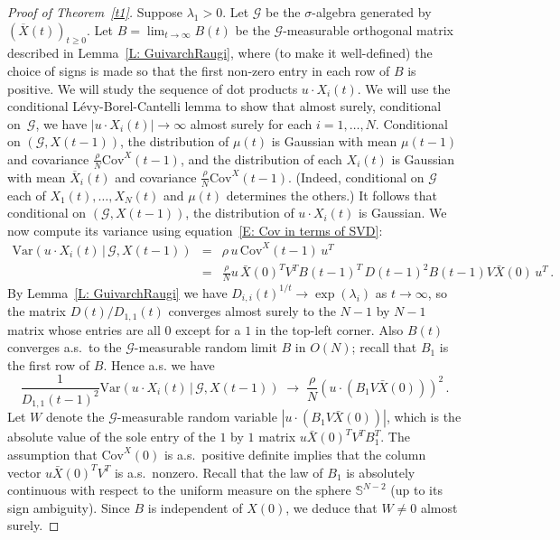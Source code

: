 \documentclass[12pt]{article}
\newcommand{\Cov}{\mathrm{Cov}}
\newcommand{\1}{\mathbf{1}}
\begin{document}
\begin{proof}[Proof of Theorem~\ref{t1}]
Suppose $\lambda_1 > 0$. Let $\mathcal{G}$ be the $\sigma$-algebra generated by $(\overline{X}(t))_{t \ge 0}$. 
Let $B = \lim_{t \to \infty} B(t)$ be the $\mathcal{G}$-measurable orthogonal matrix described in Lemma~\ref{L: GuivarchRaugi}, where (to make it well-defined) the choice of signs is made so that the first non-zero entry in each row of $B$ is positive. We will study the sequence of dot products $u \cdot X_i(t)$.
We will use the conditional L\'evy-Borel-Cantelli lemma to show that almost surely, conditional on~$\mathcal{G}$, we have $|u \cdot X_i(t)| \to \infty$ almost surely for each $i=1, \dots, N$. Conditional on $(\mathcal{G}, X(t-1))$, the distribution of $\mu(t)$ is Gaussian with mean $\mu(t-1)$ and covariance $\frac{\rho}{N} \Cov^X(t-1)$, and the distribution of each $X_i(t)$ is Gaussian with mean $\overline{X}_i(t)$ and covariance $\frac{\rho}{N} \Cov^X(t-1)$. (Indeed, conditional on $\mathcal{G}$ each of $X_1(t), \dots, X_N(t)$ and $\mu(t)$ determines the others.) It follows that conditional on $(\mathcal{G}, X(t-1))$, the distribution of $u \cdot X_i(t)$ is Gaussian. We now compute its variance using equation~\eqref{E: Cov in terms of SVD}:
\begin{eqnarray*} \mathrm{Var}(u \cdot X_i(t) \,|\, \mathcal{G}, X(t-1)) &=& \rho\, u\, \Cov^X\!(t-1)\, u^T \\
 &  = & \frac{\rho}{N} u\, \bar X(0)^T V^T B(t-1)^T\,D(t-1)^2B(t-1) V \bar X(0)\,  u^T\,.
\end{eqnarray*}
By Lemma~\ref{L: GuivarchRaugi} {we have $D_{i,i}(t)^{1/t} \to \exp(\lambda_i)$ as $t \to \infty$, so} the matrix $D(t)/D_{1,1}(t)$ converges almost surely to the {$N-1$ by $N-1$} matrix whose entries are all $0$ except for a $1$ in the top-left corner. Also $B(t)$ converges a.s.~to the $\mathcal{G}$-measurable random limit $B$ in $O(N)$; {recall that $B_1$ is the first row of $B$}. Hence a.s. we have 
$$\frac{1}{D_{1,1}(t-1)^2} \mathrm{Var}(u \cdot X_i(t) \,|\, \mathcal{G}, X(t-1)) \; \to \; \frac{\rho}{N } \left(u \cdot (B_1 V \bar X(0)) \right)^2\,.$$  Let $W$ denote the $\mathcal{G}$-measurable random variable $|u \cdot (B_1 V \bar X(0))|$, which is the absolute value of the sole entry of the $1$ by $1$ matrix $u \bar X(0)^T V^T B_1^T$. The assumption that $\mathrm{Cov}^X(0)$ is a.s.~positive definite implies that the column vector $u \bar X(0)^T V^T$ is a.s.~nonzero.  Recall that the law of $B_1$ is absolutely continuous with respect to the uniform measure on the sphere $\mathbb{S}^{N-2}$ (up to its sign ambiguity). Since $B$ is independent of $X(0)$, we deduce that $W \neq 0$ almost surely. 

\end{proof}
\end{document}
